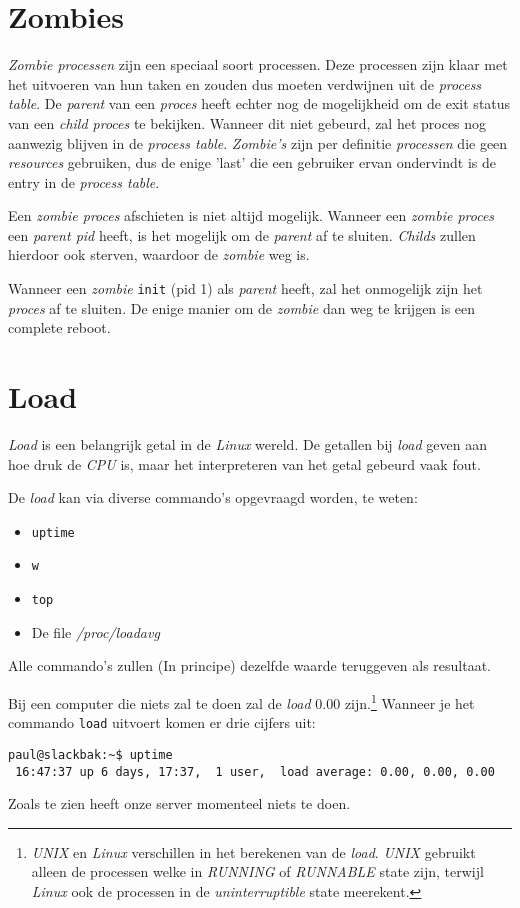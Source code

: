 \section{Zombies}
\emph{Zombie processen} zijn een speciaal soort processen. Deze processen zijn klaar met het uitvoeren van hun taken en zouden dus moeten verdwijnen uit de \emph{process table}. De \emph{parent} van een \emph{proces} heeft echter nog de mogelijkheid om de exit status van een \emph{child proces} te bekijken. Wanneer dit niet gebeurd, zal het proces nog aanwezig blijven in de \emph{process table}. \emph{Zombie's} zijn per definitie \emph{processen} die geen \emph{resources} gebruiken, dus de enige 'last' die een gebruiker ervan ondervindt is de entry in de \emph{process table}. 

Een \emph{zombie proces} afschieten is niet altijd mogelijk. Wanneer een \emph{zombie proces} een \emph{parent pid} heeft, is het mogelijk om de \emph{parent} af te sluiten. \emph{Childs} zullen hierdoor ook sterven, waardoor de \emph{zombie} weg is. 

Wanneer een \emph{zombie} \texttt{init} (pid 1) als \emph{parent} heeft, zal het onmogelijk zijn het \emph{proces} af te sluiten. De enige manier om de \emph{zombie} dan weg te krijgen is een complete reboot. 

\section{Load}
\emph{Load}\cite{bib.load} is een belangrijk getal in de \emph{Linux} wereld. De getallen bij \emph{load} geven aan hoe druk de \emph{CPU} is, maar het interpreteren van het getal gebeurd vaak fout.

De \emph{load} kan via diverse commando's opgevraagd worden, te weten:
\begin{itemize}
  \item \texttt{uptime}
  \item \texttt{w}
  \item \texttt{top}
  \item De file \emph{/proc/loadavg}
\end{itemize}
Alle commando's zullen (In principe) dezelfde waarde teruggeven als resultaat.

Bij een computer die niets zal te doen zal de \emph{load} 0.00 zijn.\footnote{\emph{UNIX} en \emph{Linux} verschillen in het berekenen van de \emph{load}. \emph{UNIX} gebruikt alleen de processen welke in \emph{RUNNING} of \emph{RUNNABLE} state zijn, terwijl \emph{Linux} ook de processen in de \emph{uninterruptible} state meerekent. }
Wanneer je het commando \texttt{load} uitvoert komen er drie cijfers uit: 
\begin{lstlisting}
paul@slackbak:~$ uptime  
 16:47:37 up 6 days, 17:37,  1 user,  load average: 0.00, 0.00, 0.00
\end{lstlisting}%
Zoals te zien heeft onze server momenteel niets te doen.

